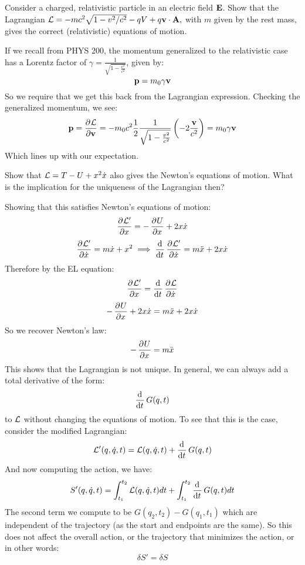 \documentclass[../PHYS306Notes.tex]{subfiles}
\begin{document}
\begin{p}
Consider a charged, relativistic particle in an electric field $\mathbf{E}$. Show that the Lagrangian $\mathcal{L}=-m c^{2} \sqrt{1-v^{2} / c^{2}}-q V+q \mathbf{v} \cdot \mathbf{A},$ with $m$ given by the rest mass, gives the correct (relativistic) equations of motion.
\end{p}
\begin{s}
If we recall from PHYS 200, the momentum generalized to the relativistic case has a Lorentz factor of $\gamma = \frac{1}{\sqrt{1- \frac{v^2}{c^2}}}$, given by:
\[\mathbf{p} = m_0\gamma\mathbf{v}\]
So we require that we get this back from the Lagrangian expression. Checking the generalized momentum, we see:
\[\v{p} = \dpd{\LL}{\v{v}} = -m_0c^2\frac{1}{2}\frac{1}{\sqrt{1-\frac{v^2}{c^2}}}\left(-2\frac{\v{v}}{c^2}\right) = m_0\gamma\v{v}\]
Which lines up with our expectation.
\end{s}

\begin{p}
Show that $\mathcal{L} = T - U +x^2\dot{x}$ also gives the Newton’s equations of motion. What is the implication for the uniqueness of the Lagrangian then?
\end{p}
\begin{s}
Showing that this satisfies Newton's equations of motion:
\[\dpd{\LL'}{x} = -\dpd{U}{x} + 2x\dot{x}\]
\[\dpd{\LL'}{\dot{x}} = m\dot{x} + x^2 \implies \dod{}{t}\dpd{\LL'}{\dot{x}} = m\ddot{x} + 2x\dot{x}\]
Therefore by the EL equation:
\[\dpd{\LL'}{x} = \dod{}{t}\dpd{\LL}{\dot{x}}\]
\[-\dpd{U}{x} + 2x\dot{x} = m\ddot{x} + 2x\dot{x}\]
So we recover Newton's law:
\[-\dpd{U}{x} = m\ddot{x}\]
This shows that the Lagrangian is not unique. In general, we can always add a total derivative of the form:
\[\dod{}{t}G(q,t)\]
to $\mathcal{L}$ without changing the equations of motion. To see that this is the case, consider the modified Lagrangian:
\[\LL'(q, \dot{q}, t) = \LL(q, \dot{q}, t) + \dod{}{t}G(q,t)\]
And now computing the action, we have:
\[S'(q, \dot{q}, t) = \int_{t_1}^{t_2}\LL(q, \dot{q}, t)dt + \int_{t_1}^{t_2}\dod{}{t}G(q, t)dt\]
The second term we compute to be $G(q_2, t_2) - G(q_1, t_1)$ which are independent of the trajectory (as the start and endpoints are the same). So this does not affect the overall action, or the trajectory that minimizes the action, or in other words:
\[\delta S' = \delta S\]
\end{s}
\end{document}
